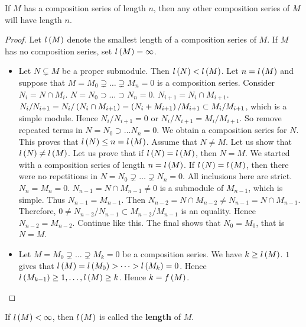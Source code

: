 \begin{proposition}
If $ M $ has a composition series of length $ n $, then any other composition series of $ M $ will have length $ n $.
\end{proposition}

\begin{proof}
Let $ l\left( M \right) $ denote the smallest length of a composition series of $ M $. If $ M $ has no composition series, set $ l\left( M \right) = \infty $.
\begin{itemize}
\item Let $ N \subsetneq M $ be a proper submodule. Then $ l\left( N \right) < l\left( M \right) $. Let $ n = l\left( M \right) $ and suppose that $ M = M_0 \supsetneq \dots \supsetneq M_n = 0 $ is a composition series. Consider $ N_i = N \cap M_i $. $ N = N_0 \supset \dots \supset N_n = 0 $. $ N_{i + 1} = N_i \cap M_{i + 1} $. $ N_i / N_{i + 1} = N_i / \left( N_i \cap M_{i + 1} \right) = \left( N_i + M_{i + 1} \right) / M_{i + 1} \subset M_i / M_{i + 1} $, which is a simple module. Hence $ N_i / N_{i + 1} = 0 $ or $ N_i / N_{i + 1} = M_i / M_{i + 1} $. So remove repeated terms in $ N = N_0 \supset \dots N_n = 0 $. We obtain a composition series for $ N $. This proves that $ l\left( N \right) \le n = l\left( M \right) $. Assume that $ N \ne M $. Let us show that $ l\left( N \right) \ne l\left( M \right) $. Let us prove that if $ l\left( N \right) = l\left( M \right) $, then $ N = M $. We started with a composition series of length $ n = l\left( M \right) $. If $ l\left( N \right) = l\left( M \right) $, then there were no repetitions in $ N = N_0 \supsetneq \dots \supsetneq N_n = 0 $. All inclusions here are strict. $ N_n = M_n = 0 $. $ N_{n - 1} = N \cap M_{n - 1} \ne 0 $ is a submodule of $ M_{n - 1} $, which is simple. Thus $ N_{n - 1} = M_{n - 1} $. Then $ N_{n - 2} = N \cap M_{n - 2} \ne N_{n - 1} = N \cap M_{n - 1} $. Therefore, $ 0 \ne N_{n - 2} / N_{n - 1} \subset M_{n - 2} / M_{n - 1} $ is an equality. Hence $ N_{n - 2} = M_{n - 2} $. Continue like this. The final shows that $ N_0 = M_0 $, that is $ N = M $.
\item Let $ M = M_0 \supsetneq \dots \supsetneq M_k = 0 $ be a composition series. We have $ k \ge l\left( M \right) $. $ 1 $ gives that $ l\left( M \right) = l\left( M_0 \right) > \dots > l\left( M_k \right) = 0 $. Hence $ l\left( M_{k - 1} \right) \ge 1, \dots, l\left( M \right) \ge k $. Hence $ k = f\left( M \right) $.
\end{itemize}
\end{proof}

\begin{definition}
If $ l\left( M \right) < \infty $, then $ l\left( M \right) $ is called the \textbf{length} of $ M $.
\end{definition}


